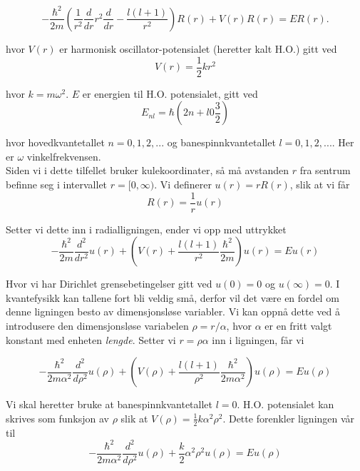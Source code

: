 \documentclass{article}
\begin{document}
\begin{equation}
  -\frac{\hbar^2}{2 m} \left ( \frac{1}{r^2} \frac{d}{dr} r^2
  \frac{d}{dr} - \frac{l (l + 1)}{r^2} \right )R(r) 
     + V(r) R(r) = E R(r).
\end{equation}

hvor $V(r)$ er harmonisk oscillator-potensialet (heretter kalt H.O.) gitt ved
\begin{equation}
V(r) = \frac{1}{2}kr^2
\end{equation}

hvor $k = m\omega^2$. $E$ er energien til H.O. potensialet, gitt ved
\begin{equation}
E_{nl} = \hbar\left(2n + l 0 \frac{3}{2} \right)
\end{equation}

hvor hovedkvantetallet $n = 0,1,2,...$ og banespinnkvantetallet $l = 0,1,2,...$. Her er $\omega$ vinkelfrekvensen.\\

Siden vi i dette tilfellet bruker kulekoordinater, så må avstanden $r$ fra sentrum befinne seg i intervallet $r = [0, \infty)$. Vi definerer $u(r) = rR(r)$, slik at vi får 
\begin{equation}
R(r) = \frac{1}{r}u(r)
\end{equation}

Setter vi dette inn i radialligningen, ender vi opp med uttrykket 
\begin{equation}
  -\frac{\hbar^2}{2 m} \frac{d^2}{dr^2} u(r) 
       + \left ( V(r) + \frac{l (l + 1)}{r^2}\frac{\hbar^2}{2 m}
                                    \right ) u(r)  = E u(r)
\end{equation}

Hvor vi har Dirichlet grensebetingelser gitt ved $u(0) = 0$ og $u(\infty) = 0$. I kvantefysikk kan tallene fort bli veldig små, derfor vil det være en fordel om denne ligningen besto av dimensjonsløse variabler. Vi kan oppnå dette ved å introdusere den dimensjonsløse variabelen $\rho = r/\alpha$, hvor $\alpha$ er en fritt valgt konstant med enheten \textit{lengde}. Setter vi $r = \rho \alpha$ inn i ligningen, får vi

\begin{equation}
  -\frac{\hbar^2}{2 m \alpha^2} \frac{d^2}{d\rho^2} u(\rho) 
       + \left ( V(\rho) + \frac{l (l + 1)}{\rho^2}
         \frac{\hbar^2}{2 m\alpha^2} \right ) u(\rho)  = E u(\rho)
\end{equation} 

Vi skal heretter bruke at banespinnkvantetallet $l = 0$. H.O. potensialet kan skrives som funksjon av $\rho$ slik at $V(\rho) = \frac{1}{2}k\alpha^2\rho^2$. Dette forenkler ligningen vår til
\begin{equation}
  -\frac{\hbar^2}{2 m \alpha^2} \frac{d^2}{d\rho^2} u(\rho) 
       + \frac{k}{2} \alpha^2\rho^2u(\rho)  = E u(\rho)
\end{equation}
\end{document}
